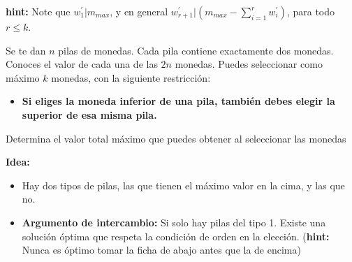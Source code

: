 \documentclass[12pt]{beamer}
\begin{document}
\begin{frame}
\begin{bloque}[\textcolor{black}{POI 2007 Weights} (\href{https://szkopul.edu.pl/problemset/problem/h_QPStxSmfEHuL2h_I5Qpa29/site/?key=statement}{szkopul})]

    
\textbf{hint:} Note que $w^{'}_1 \vert m_{max}$, y en general $w^{'}_{r + 1} \vert (m_{max} - \sum\limits_{i=1}^r w^{'}_i)$, para todo $r \le k$.
    
\end{bloque}

\end{frame}


\begin{frame}
\begin{bloque}
Se te dan $n$ pilas de monedas. Cada pila contiene exactamente dos monedas. Conoces el valor de cada una de las $2n$ monedas. Puedes seleccionar como máximo $k$ monedas, con la siguiente restricción: 

\begin{itemize}
    \item \textbf{Si eliges la moneda inferior de una pila, también debes elegir la superior de esa misma pila.}
\end{itemize}

Determina el valor total máximo que puedes obtener al seleccionar las monedas

\end{bloque}
\end{frame}

\begin{frame}
\begin{bloque}

\textbf{Idea:}
\begin{itemize}
    \item Hay dos tipos de pilas, las que tienen el máximo valor en la cima, y las que no.
    \pause
    \item \textbf{Argumento de intercambio:} Si solo hay pilas del tipo 1. Existe una solución óptima que respeta la condición de orden en la elección. (\textbf{hint:} Nunca es óptimo tomar la ficha de abajo antes que la de encima)
\end{itemize}

\end{bloque}
\end{frame}
\end{document}
